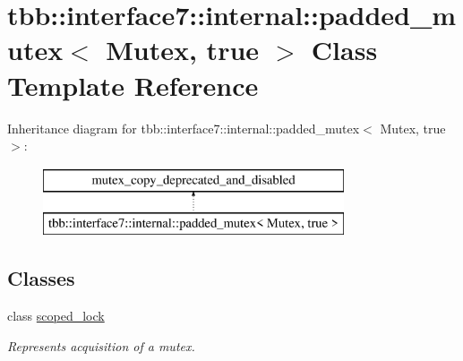 \hypertarget{classtbb_1_1interface7_1_1internal_1_1padded__mutex_3_01Mutex_00_01true_01_4}{}\section{tbb\+:\+:interface7\+:\+:internal\+:\+:padded\+\_\+mutex$<$ Mutex, true $>$ Class Template Reference}
\label{classtbb_1_1interface7_1_1internal_1_1padded__mutex_3_01Mutex_00_01true_01_4}
Inheritance diagram for tbb\+:\+:interface7\+:\+:internal\+:\+:padded\+\_\+mutex$<$ Mutex, true $>$\+:\begin{figure}[H]
\begin{center}
\leavevmode
\includegraphics[height=2.000000cm]{classtbb_1_1interface7_1_1internal_1_1padded__mutex_3_01Mutex_00_01true_01_4}
\end{center}
\end{figure}
\subsection*{Classes}
\begin{DoxyCompactItemize}
\item 
class \hyperlink{classtbb_1_1interface7_1_1internal_1_1padded__mutex_3_01Mutex_00_01true_01_4_1_1scoped__lock}{scoped\+\_\+lock}
\begin{DoxyCompactList}\small\item\em Represents acquisition of a mutex. \end{DoxyCompactList}\end{DoxyCompactItemize}
